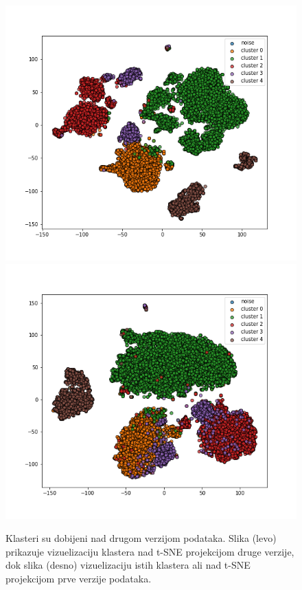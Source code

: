 \documentclass[a4paper]{article}
\begin{document}
\begin{figure}[H]
	\centering
	\includegraphics[scale=0.35]{kmeans5_grp1v2}
	\includegraphics[scale=0.35]{kmeans5_grp1v2_nav1}
	\caption{Klasteri su dobijeni nad drugom verzijom podataka. Slika (levo) prikazuje vizuelizaciju klastera nad t-SNE projekcijom druge verzije, dok slika (desno) vizuelizaciju istih klastera ali nad t-SNE projekcijom prve verzije podataka. }
	\label{kmeans5_grp1v2}
\end{figure}
\end{document}
